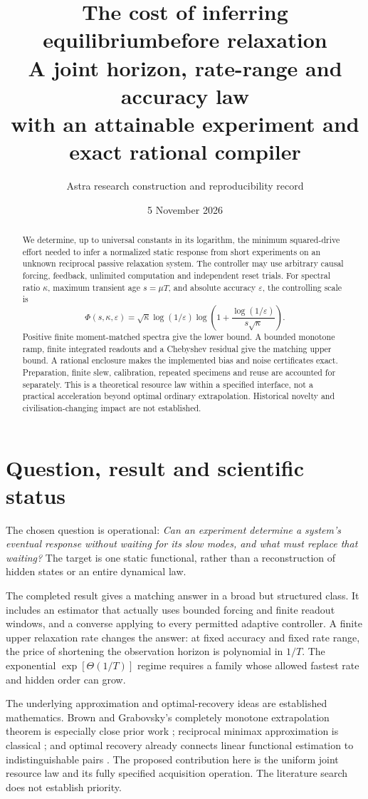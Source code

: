 \documentclass[11pt,a4paper]{article}
\title{\textbf{The cost of inferring equilibrium\newline before relaxation}\\[5pt]
\large A joint horizon, rate-range and accuracy law\\
with an attainable experiment and exact rational compiler}
\author{Astra research construction and reproducibility record}
\date{5 November 2026}
\begin{document}
\maketitle
\begin{abstract}
We determine, up to universal constants in its logarithm, the minimum squared-drive effort needed to infer a normalized static response from short experiments on an unknown reciprocal passive relaxation system. The controller may use arbitrary causal forcing, feedback, unlimited computation and independent reset trials. For spectral ratio $\kappa$, maximum transient age $s=\mu T$, and absolute accuracy $\varepsilon$, the controlling scale is
\[
\Phi(s,\kappa,\varepsilon)=\sqrt\kappa\log(1/\varepsilon)
\log\!\left(1+\frac{\log(1/\varepsilon)}{s\sqrt\kappa}\right).
\]
Positive finite moment-matched spectra give the lower bound. A bounded monotone ramp, finite integrated readouts and a Chebyshev residual give the matching upper bound. A rational enclosure makes the implemented bias and noise certificates exact. Preparation, finite slew, calibration, repeated specimens and reuse are accounted for separately. This is a theoretical resource law within a specified interface, not a practical acceleration beyond optimal ordinary extrapolation. Historical novelty and civilisation-changing impact are not established.
\end{abstract}

\section{Question, result and scientific status}

The chosen question is operational: \emph{Can an experiment determine a system's eventual response without waiting for its slow modes, and what must replace that waiting?} The target is one static functional, rather than a reconstruction of hidden states or an entire dynamical law.

The completed result gives a matching answer in a broad but structured class. It includes an estimator that actually uses bounded forcing and finite readout windows, and a converse applying to every permitted adaptive controller. A finite upper relaxation rate changes the answer: at fixed accuracy and fixed rate range, the price of shortening the observation horizon is polynomial in $1/T$. The exponential $\exp[\Theta(1/T)]$ regime requires a family whose allowed fastest rate and hidden order can grow.

The underlying approximation and optimal-recovery ideas are established mathematics. Brown and Grabovsky's completely monotone extrapolation theorem is especially close prior work \cite{brown}; reciprocal minimax approximation is classical \cite{kraus}; and optimal recovery already connects linear functional estimation to indistinguishable pairs \cite{donoho}. The proposed contribution here is the uniform joint resource law and its fully specified acquisition operation. The literature search does not establish priority.
\end{document}
